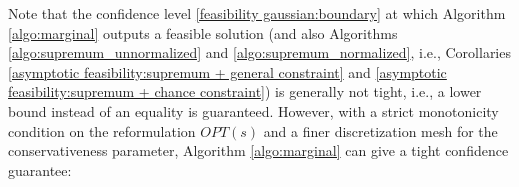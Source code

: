 \documentclass[mnsc,blindrev]{informs4} %
\begin{document}

Note that the confidence level \eqref{feasibility gaussian:boundary} at which Algorithm \ref{algo:marginal} outputs a feasible solution (and also Algorithms \ref{algo:supremum_unnormalized} and \ref{algo:supremum_normalized}, i.e., Corollaries \ref{asymptotic feasibility:supremum + general constraint} and \ref{asymptotic feasibility:supremum + chance constraint}) is generally not tight, i.e., a lower bound instead of an equality is guaranteed. However, with a strict monotonicity condition on the reformulation $OPT(s)$ and a finer discretization mesh for the conservativeness parameter, Algorithm \ref{algo:marginal} can give a tight confidence guarantee:

\end{document}
